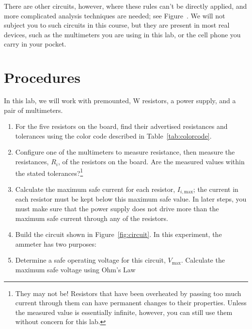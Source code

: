 \documentclass[12pt]{article}
\begin{document}
 There are other circuits, however, where
these rules can't be directly applied, and more complicated analysis
techniques are needed; see Figure~.  We will not subject
you to such circuits in this course, but they are present in most real
devices, such as the multimeters you are using in this lab, or the
cell phone you carry in your pocket.

\section{Procedures}
\label{sec:procedures}

In this lab, we will work with premounted, \unit[1]{W} resistors, a
power supply, and a pair of multimeters.  

\begin{enumerate}
\item For the five resistors on the board, find their advertised
  resistances and tolerances using the color code described in
  Table~\ref{tab:colorcode}.
\item Configure one of the multimeters to measure resistance, then
  measure the resistances, $R_i$, of the resistors on the board.  Are
  the measured values within the stated tolerances?\footnote{They may
    not be!  Resistors that have been overheated by passing too much
    current through them can have permanent changes to their
    properties.  Unless the measured value is essentially infinite,
    however, you can still use them without concern for this lab.}
\item Calculate the maximum safe current for each resistor,
  $I_{i,\mathrm{max}}$; the current in each resistor must be kept
  below this maximum safe value.  In later steps, you must make sure
  that the power supply does not drive more than the maximum safe
  current through any of the resistors.
\item Build the circuit shown in Figure~\ref{fig:circuit}.  In this
  experiment, the ammeter has two purposes:
\item Determine a safe operating voltage for this circuit,
  $V_\text{max}$.  Calculate the maximum safe voltage using Ohm's Law

\end{enumerate}
\end{document}
